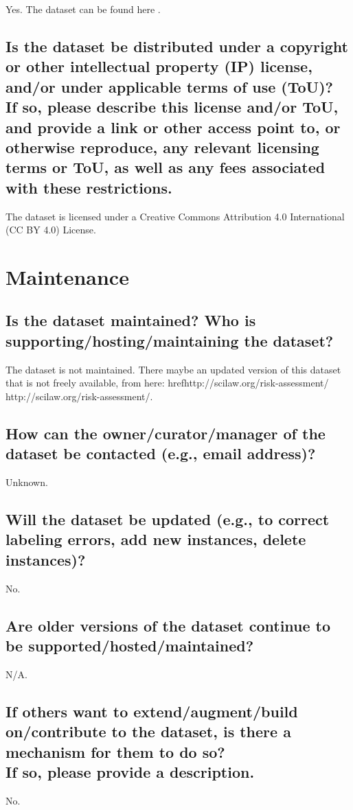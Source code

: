 \documentclass[letterpaper, 10 pt, conference]{ieeeconf}  %
\newcommand{\subtitle}[1]{{\\ \small \normalfont \color{purple} #1}}
\begin{document}
Yes. The dataset can be found here \cite{Neulaw}.

\subsection{Is the dataset be distributed under a copyright or other intellectual property (IP) license, and/or under applicable terms of use (ToU)? \subtitle{If so, please describe this license and/or ToU, and provide a link or other access point to, or otherwise reproduce, any relevant licensing terms or ToU, as well as any fees associated with these restrictions.}}

The dataset is licensed under a Creative Commons Attribution 4.0 International (CC BY 4.0) License.

\section{Maintenance}


\subsection{Is the dataset maintained? Who is supporting/hosting/maintaining the dataset?}

The dataset is not maintained. There maybe an updated version of this dataset that is not freely available, from here:
href{http://scilaw.org/risk-assessment/
}{http://scilaw.org/risk-assessment/}.

\subsection{How can the owner/curator/manager of the dataset be contacted (e.g., email address)?}

Unknown.

\subsection{Will the dataset be updated (e.g., to correct labeling errors, add new instances, delete instances)?}

No.

\subsection{Are older versions of the dataset continue to be supported/hosted/maintained?}

N/A.

\subsection{If others want to extend/augment/build on/contribute to the dataset, is there a mechanism for them to do so? \subtitle{If so, please provide a description.}}

No.


\medskip
 
  

\end{document}
